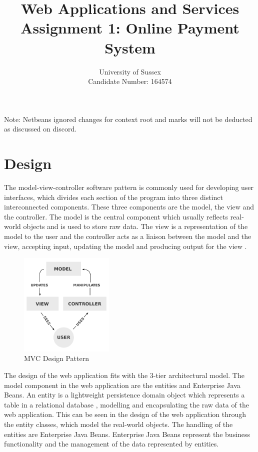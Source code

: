 \documentclass{article}
\title{ \LARGE Web  Applications and Services\\
 \Large Assignment 1: Online Payment System}
\author{University of Sussex \\
	Candidate Number: 164574}
\date{}
\begin{document}
\maketitle

\newpage

\tableofcontents

\newpage

Note: Netbeans ignored changes for context root and marks will not be deducted as discussed on discord.

\section{Design}

The model-view-controller software pattern is commonly used for developing user interfaces, which divides each section of the program into three distinct interconnected components. These three components are the model, the view and the controller. The model is the central component which usually reflects real-world objects and is used to store raw data. The view is a representation of the model to the user and the controller acts as a liaison between the model and the view, accepting input, updating the model and producing output for the view \cite{deacon2009model}.

\begin{figure}[h!]
  \centering
  \includegraphics[width=0.4\textwidth]{images/mvc.png}
  \caption{MVC Design Pattern \cite{mvc}}
\end{figure}

The design of the web application fits with the 3-tier architectural model. The model component in the web application are the entities and Enterprise Java Beans. An entity is a lightweight persistence domain object which represents a table in a relational database \cite{entites}, modelling and encapsulating the raw data of the web application. This can be seen in the design of the web application through the entity classes, which model the real-world objects. The handling of the entities are Enterprise Java Beans. Enterprise Java Beans represent the business functionality and the management of the data represented by entities. \\
\end{document}
